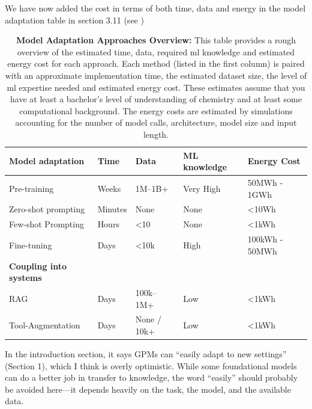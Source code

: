 \begin{reply}

We have now added the cost in terms of both time, data and energy in the model adaptation table in section 3.11 (see )

\begin{table}[H]
    \centering
    \caption{\textbf{Model Adaptation Approaches Overview:} This table provides a rough overview of the estimated time, data, required \gls{ml} knowledge and estimated energy cost for each approach. Each method (listed in the first column) is paired with an approximate implementation time, the estimated dataset size, the level of \gls{ml} expertise needed and estimated energy cost.  These estimates assume that you have at least a bachelor's level of understanding of chemistry and at least some computational background. The energy costs are estimated by simulations \cite{ozcan2025quantifying, luccioni2024light} accounting for the number of model calls, architecture, model size and input length.}
\begin{tabular}{lllll}
\toprule
    \textbf{Model adaptation}  & \textbf{Time}    & \textbf{Data}   & \textbf{ML knowledge} & 
    \textbf{Energy Cost} \\ 
\midrule
Pre-training       & Weeks   & 1M--1B+      & Very High & 50MWh - 1GWh  \\
Zero-shot prompting & Minutes & None        & None & \textless 10Wh \\
Few-shot Prompting   & Hours   & \textless 10 & None  & \textless 1kWh  \\
Fine-tuning         & Days    & \textless 10k         & High     &   100kWh - 50MWh  \\
\toprule
    \textbf{Coupling into systems} \\ 
\midrule
RAG                & Days    & 100k--1M+    & Low     &   \textless 1kWh   \\
Tool-Augmentation   & Days    & None / 10k+ & Low     &  \textless 1kWh  \\
\bottomrule
\end{tabular}
    \label{tab:model_adaptation}
\end{table}

\end{reply}


\begin{point}
In the introduction section, it says GPMs can ``easily adapt to new settings'' (Section 1), which I think is overly optimistic. While some foundational models can do a better job in transfer to knowledge, the word ``easily'' should probably be avoided here—it depends heavily on the task, the model, and the available data.
\end{point}

